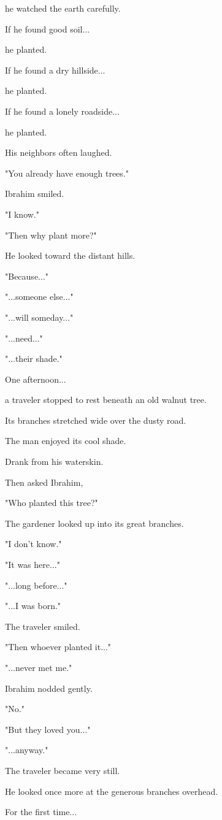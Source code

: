 \documentclass[12pt,openany]{book}
\begin{document}
he watched the earth carefully.

If he found good soil...

he planted.

If he found a dry hillside...

he planted.

If he found a lonely roadside...

he planted.

His neighbors often laughed.

"You already have enough trees."

Ibrahim smiled.

"I know."

"Then why plant more?"

He looked toward the distant hills.

"Because..."

"...someone else..."

"...will someday..."

"...need..."

"...their shade."

One afternoon...

a traveler stopped to rest beneath an old walnut tree.

Its branches stretched wide over the dusty road.

The man enjoyed its cool shade.

Drank from his waterskin.

Then asked Ibrahim,

"Who planted this tree?"

The gardener looked up into its great branches.

"I don't know."

"It was here..."

"...long before..."

"...I was born."

The traveler smiled.

"Then whoever planted it..."

"...never met me."

Ibrahim nodded gently.

"No."

"But they loved you..."

"...anyway."

The traveler became very still.

He looked once more at the generous branches overhead.

For the first time...
\end{document}
